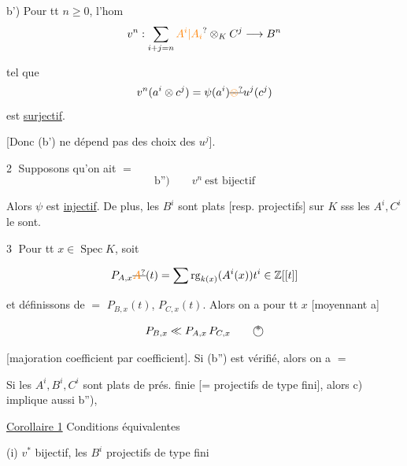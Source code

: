 b') Pour tt $n\geq0$, l'hom
\[
v^n:\sum_{i+j=n}\unsure{A^i|A_i}\otimes_K C^j\longrightarrow B^n
\]

 tel que
\[
 v^n(a^i\otimes c^j)=\psi(a^i)\deleted{\unsure{\otimes}}u^j(c^j)
\]
est \uline{surjectif}.

[Donc (b') ne dépend pas des choix des $u^j$].

\textcircled{2} Supposons qu'on ait $=$
\[
\text{b'')}\qquad v^n\ \text{est bijectif}
\]

Alors $\psi$ est \uline{injectif}.  De plus, les $B^i$ sont plats [resp.  projectifs] sur $K$ sss les $A^i,C^i$ le sont.


\textcircled{3}  Pour tt $x\in\operatorname{Spec} K$, soit

\[
 P_{A,x}\deleted{\unsure{A}}(t)=\sum\operatorname{rg}_{k(x)}(A^i(x))t^i\in\mathbb Z[[t]]
\]

et définissons de $=$ $P_{B,x}(t)$, $P_{C,x}(t)$. Alors on a  pour tt $x$ [moyennant a]

\[
P_{B,x}\ll P_{A,x}\,P_{C,x}\tag*{\textcircled{*}}
\]

[majoration coefficient par coefficient]. Si (b'') est vérifié, alors on a $=$


Si les $A^i,B^i,C^i$ sont plats de prés. finie [= projectifs de type fini], alors c) implique aussi b''), 

\uline{Corollaire 1} Conditions équivalentes 

(i) $v^*$ bijectif, les $B^i$ projectifs de type fini

